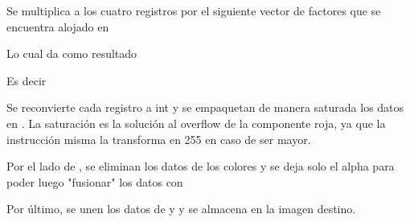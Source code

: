  

 

 

 

Se multiplica a los cuatro registros por el siguiente vector de factores que se encuentra alojado en 

 

Lo cual da como resultado

 

 

 

 

Es decir

 

 

 

 

Se reconvierte cada registro a int y se empaquetan de manera saturada los datos en . La saturación es la solución al overflow de la componente roja, ya que la instrucción misma la transforma en 255 en caso de ser mayor.

 

Por el lado de , se eliminan los datos de los colores y se deja solo el alpha para poder luego "fusionar" los datos con 

 

Por último, se unen los datos de  y  y se almacena en la imagen destino.

 

